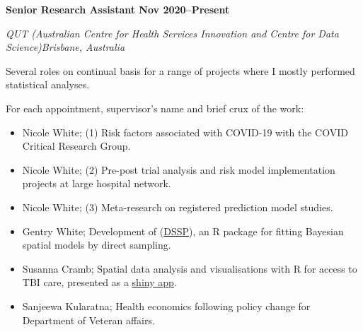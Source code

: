 
\textbf{Senior Research Assistant \hfill Nov 2020--Present}\par
\textit{QUT (Australian Centre for Health Services Innovation and Centre for Data Science)\hfill Brisbane, Australia}\par
Several roles on continual basis for a range of projects where I mostly performed statistical analyses.\par
For each appointment, supervisor's name and brief crux of the work:\par
\begin{itemize}
	\item Nicole White; (1) Risk factors associated with COVID-19 with the COVID Critical Research Group.
	\item Nicole White; (2) Pre-post trial analysis and risk model implementation projects at large hospital network.
	\item Nicole White; (3) Meta-research on registered prediction model studies.
    \item Gentry White; Development of (\href{https://cran.r-project.org/web/packages/DSSP/index.html}{DSSP}), an R package for fitting Bayesian spatial models by direct sampling.
	\item Susanna Cramb; Spatial data analysis and visualisations with R for access to TBI care, presented as a \href{https://github.com/RWParsons/iTRAQI_app/}{shiny app}.
	\item Sanjeewa Kularatna; Health economics following policy change for Department of Veteran affairs.
\end{itemize}\par